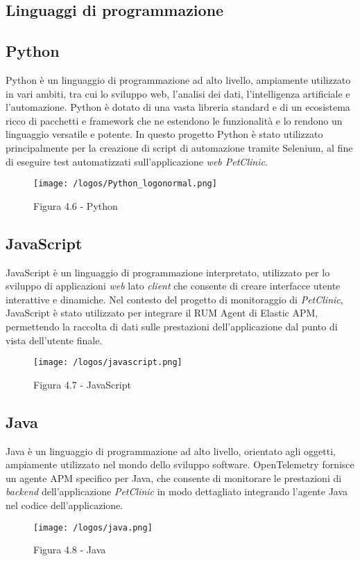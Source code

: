 \subsection{Linguaggi di programmazione}
\subsection*{Python}
Python è un linguaggio di programmazione ad alto livello, ampiamente utilizzato in vari ambiti, tra cui lo sviluppo web, l'analisi dei dati, l'intelligenza artificiale e l'automazione. Python è dotato di una vasta libreria standard e di un ecosistema ricco di pacchetti e framework che ne estendono le funzionalità e lo rendono un linguaggio versatile e potente. In questo progetto Python è stato utilizzato principalmente per la creazione di script di automazione tramite Selenium, al fine di eseguire test automatizzati sull'applicazione \emph{web PetClinic}.
\begin{figure}[H] 
    \centering 
    \texttt{[image: /logos/Python\_logonormal.png]} 
    \caption{Figura 4.6 - Python}
\end{figure}

\vspace{1em}

\subsection*{JavaScript}
JavaScript è un linguaggio di programmazione interpretato, utilizzato per lo sviluppo di applicazioni \emph{web} lato \emph{client} che consente di creare interfacce utente interattive e dinamiche. Nel contesto del progetto di monitoraggio di \emph{PetClinic}, JavaScript è stato utilizzato per integrare il RUM Agent di Elastic APM, permettendo la raccolta di dati sulle prestazioni dell'applicazione dal punto di vista dell'utente finale.
\begin{figure}[H] 
    \centering 
    \texttt{[image: /logos/javascript.png]} 
    \caption{Figura 4.7 - JavaScript}
\end{figure}

\vspace{1em}

\subsection*{Java}
Java è un linguaggio di programmazione ad alto livello, orientato agli oggetti, ampiamente utilizzato nel mondo dello sviluppo software. OpenTelemetry fornisce un agente APM specifico per Java, che consente di monitorare le prestazioni di \emph{backend} dell'applicazione \emph{PetClinic} in modo dettagliato integrando l'agente Java nel codice dell'applicazione.
\begin{figure}[H] 
    \centering 
    \texttt{[image: /logos/java.png]} 
    \caption{Figura 4.8 - Java}
\end{figure}



